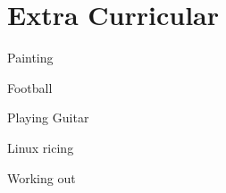 \documentclass[]{deedy-resume-openfont}
\begin{document}
\begin{minipage}[t]{0.4\textwidth}
\begin{tightemize}
\item {}

\item {}

\end{tightemize}
\sectionsep

\section{Extra Curricular}
\sectionsep
\begin{tightemize}
\item Painting
\item Football
\item Playing Guitar
\item Linux ricing
\item Working out
\end{tightemize}
\sectionsep

\end{minipage} 
\end{document}
